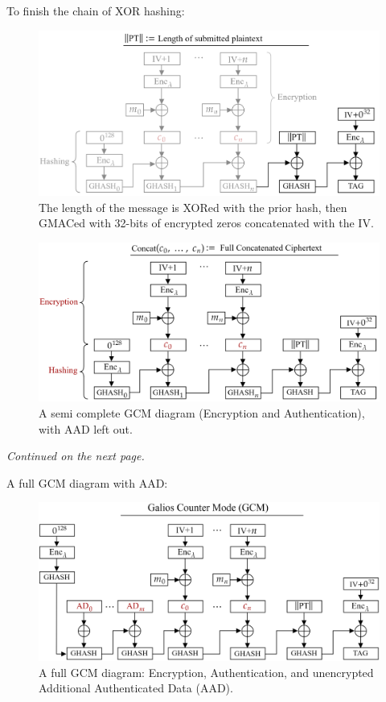 \noindent
To finish the chain of XOR hashing:
\begin{figure}[h!]
    \centering
    \includegraphics[width=1\textwidth]{Sections/sec/enc/len.png}
    \caption{The length of the message is XORed with the prior hash, then GMACed with 32-bits of encrypted zeros concatenated with the IV.}
    \label{fig:block_cipher}
\end{figure}

\begin{figure}[h!]
    \centering

    \includegraphics[width=1\textwidth]{Sections/sec/enc/semi.png}
    \caption{A semi complete GCM diagram (Encryption and Authentication), with AAD left out.}
    \label{fig:block_cipher}
\end{figure}
\noindent
\vfill
\begin{center}
    \textit{Continued on the next page.}
\end{center}
\vfill 
\newpage

\noindent
A full GCM diagram with AAD:
\begin{figure}[h!]
    \centering
    \includegraphics[width=1\textwidth]{Sections/sec/enc/gcm.png}
    \caption{A full GCM diagram: Encryption, Authentication, and unencrypted Additional Authenticated Data (AAD).}
    \label{fig:block_cipher}
\end{figure}

